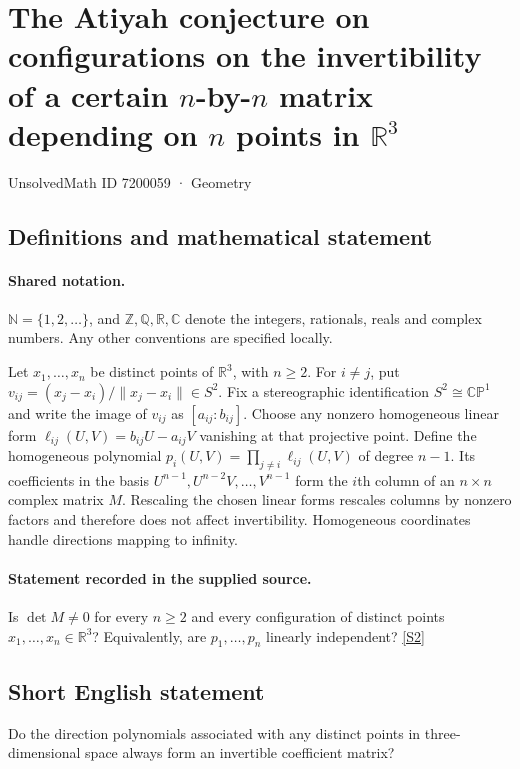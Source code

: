 \documentclass[11pt]{article}
\newcommand{\sref}[2]{\hyperlink{source:#1:#2}{[S#2]}}
\begin{document}
\setcounter{section}{7200058}
\section{The Atiyah conjecture on configurations on the invertibility of a certain $n$-by-$n$ matrix depending on $n$ points in $\mathbb{R}^{3}$}\label{7200059}
{\small\sffamily UnsolvedMath ID 7200059 · Geometry}
\subsection{Definitions and mathematical statement}

\paragraph{Shared notation.}$\mathbb N=\{1,2,\ldots\}$, and $\mathbb Z,\mathbb Q,\mathbb R,\mathbb C$ denote the integers, rationals, reals and complex numbers. Any other conventions are specified locally.


Let $x_1,\ldots,x_n$ be distinct points of $\mathbb R^3$, with $n\geq2$. For $i\ne j$, put $v_{ij}=(x_j-x_i)/\|x_j-x_i\|\in S^2$. Fix a stereographic identification $S^2\cong\mathbb{CP}^1$ and write the image of $v_{ij}$ as $[a_{ij}:b_{ij}]$. Choose any nonzero homogeneous linear form $\ell_{ij}(U,V)=b_{ij}U-a_{ij}V$ vanishing at that projective point. Define the homogeneous polynomial $p_i(U,V)=\prod_{j\ne i}\ell_{ij}(U,V)$ of degree $n-1$. Its coefficients in the basis $U^{n-1},U^{n-2}V,\ldots,V^{n-1}$ form the $i$th column of an $n\times n$ complex matrix $M$. Rescaling the chosen linear forms rescales columns by nonzero factors and therefore does not affect invertibility. Homogeneous coordinates handle directions mapping to infinity.
\paragraph{Statement recorded in the supplied source.}
Is $\det M\ne0$ for every $n\geq2$ and every configuration of distinct points $x_1,\ldots,x_n\in\mathbb R^3$? Equivalently, are $p_1,\ldots,p_n$ linearly independent? \sref{7200059}{2}
\subsection{Short English statement}
Do the direction polynomials associated with any distinct points in three-dimensional space always form an invertible coefficient matrix?
\end{document}
